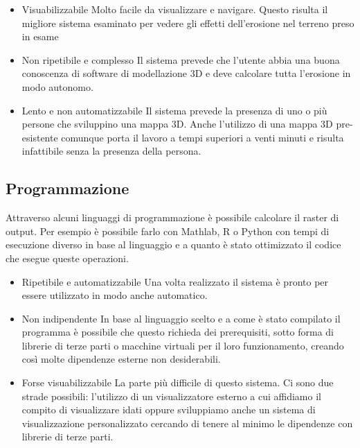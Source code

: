 \begin{itemize}
	\item{Visuabilizzabile} Molto facile da visualizzare e navigare. Questo risulta il migliore sistema esaminato per vedere gli effetti dell'erosione nel terreno preso in esame

	\item{Non ripetibile e complesso} Il sistema prevede che l'utente abbia una buona conoscenza di software di modellazione 3D e deve calcolare tutta l'erosione in modo autonomo.

	\item{Lento e non automatizzabile} Il sistema prevede la presenza di uno o più persone che sviluppino una mappa 3D. Anche l'utilizzo di una mappa 3D pre-esistente comunque porta il lavoro a tempi superiori a venti minuti e risulta infattibile senza la presenza della persona.
\end{itemize}



\subsection{Programmazione}
Attraverso alcuni linguaggi di programmazione è possibile calcolare il raster di output. Per esempio è possibile farlo con Mathlab, R o Python con tempi di esecuzione diverso in base al linguaggio e a quanto è stato ottimizzato il codice che esegue queste operazioni.

\begin{itemize}
	\item{Ripetibile e automatizzabile} Una volta realizzato il sistema è pronto per essere utilizzato in modo anche automatico.

	\item{Non indipendente} In base al linguaggio scelto e a come è stato compilato il programma è possibile che questo richieda dei prerequisiti, sotto forma di librerie di terze parti o macchine virtuali per il loro funzionamento, creando così molte dipendenze esterne non desiderabili.

	\item{Forse visuabilizzabile} La parte più difficile di questo sistema. Ci sono due strade possibili: l'utilizzo di un visualizzatore esterno a cui affidiamo il compito di visualizzare idati oppure sviluppiamo anche un sistema di visualizzazione personalizzato cercando di tenere al minimo le dipendenze con librerie di terze parti.
\end{itemize}

